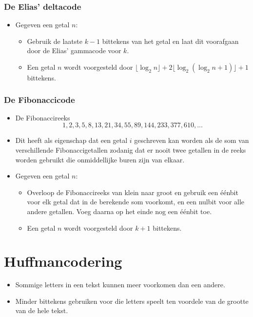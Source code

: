 \subsubsection{De Elias' deltacode}
\begin{itemize}
    \item Gegeven een getal $n$:
    \begin{itemize}
        \item Gebruik de laatste $k-1$ bittekens van het getal en laat dit voorafgaan door de Elias' gammacode voor $k$.
        \item Een getal $n$ wordt voorgesteld door $\lfloor \log_2 n\rfloor  + 2\lfloor \log_2(\log_2 n + 1)\rfloor + 1$ bittekens.
    \end{itemize}
\end{itemize}

\subsubsection{De Fibonaccicode}
\begin{itemize}
    \item De Fibonaccireeks
    $$1, 2, 3, 5, 8, 13, 21, 34, 55, 89, 144, 233, 377, 610, ...$$
    \item Dit heeft als eigenschap dat een getal $i$ geschreven kan worden als de som van verschillende Fibonaccigetallen zodanig dat er nooit twee getallen in de reeks worden gebruikt die onmiddellijke buren zijn van elkaar.
    \item Gegeven een getal $n$:
    \begin{itemize}
        \item Overloop de Fibonaccireeks van klein naar groot en gebruik een éénbit voor elk getal dat in de berekende som voorkomt, en een nulbit voor alle andere getallen. Voeg daarna op het einde nog een éénbit toe.
        \item Een getal $n$ wordt voorgesteld door $k + 1$ bittekens.
    \end{itemize}
\end{itemize}

\section{Huffmancodering}
\begin{itemize}
    \item Sommige letters in een tekst kunnen meer voorkomen dan een andere.
    \item Minder bittekens gebruiken voor die letters speelt ten voordele van de grootte van de hele tekst.
\end{itemize}

